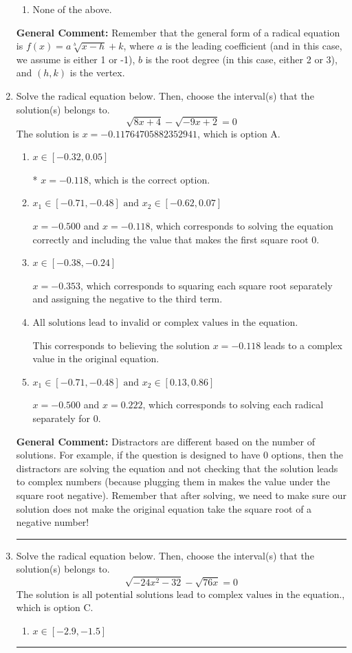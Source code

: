 \documentclass{extbook}[14pt]
\newcommand{\litem}[1]{\item #1

\rule{\textwidth}{0.4pt}}
\begin{document}
\begin{enumerate}
{\begin{enumerate}[label=\Alph*.]
\begin{multicols}{2}
\end{multicols}\item None of the above.\end{enumerate}
\textbf{General Comment:} Remember that the general form of a radical equation is $ f(x) = a \sqrt[b]{x - h} + k $, where $a$ is the leading coefficient (and in this case, we assume is either 1 or -1), $b$ is the root degree (in this case, either 2 or 3), and $(h, k)$ is the vertex.
}
\litem{
Solve the radical equation below. Then, choose the interval(s) that the solution(s) belongs to.
\[ \sqrt{8 x + 4} - \sqrt{-9 x + 2} = 0 \]The solution is \( x = -0.11764705882352941 \), which is option A.\begin{enumerate}[label=\Alph*.]
\item \( x \in [-0.32,0.05] \)

* $x = -0.118$, which is the correct option.
\item \( x_1 \in [-0.71, -0.48] \text{ and } x_2 \in [-0.62,0.07] \)

$x = -0.500$ and $x = -0.118$, which corresponds to solving the equation correctly and including the value that makes the first square root 0.
\item \( x \in [-0.38,-0.24] \)

$x = -0.353$, which corresponds to squaring each square root separately and assigning the negative to the third term.
\item \( \text{All solutions lead to invalid or complex values in the equation.} \)

This corresponds to believing the solution $x = -0.118$ leads to a complex value in the original equation.
\item \( x_1 \in [-0.71, -0.48] \text{ and } x_2 \in [0.13,0.86] \)

$x = -0.500$ and $x = 0.222$, which corresponds to solving each radical separately for 0.
\end{enumerate}

\textbf{General Comment:} Distractors are different based on the number of solutions. For example, if the question is designed to have 0 options, then the distractors are solving the equation and not checking that the solution leads to complex numbers (because plugging them in makes the value under the square root negative). Remember that after solving, we need to make sure our solution does not make the original equation take the square root of a negative number!
}
\litem{
Solve the radical equation below. Then, choose the interval(s) that the solution(s) belongs to.
\[ \sqrt{-24 x^2 - 32} - \sqrt{76 x} = 0 \]The solution is \( \text{all potential solutions lead to complex values in the equation.} \), which is option C.\begin{enumerate}[label=\Alph*.]
\item \( x \in [-2.9,-1.5] \)


\end{enumerate}}
\end{enumerate}
\end{document}
